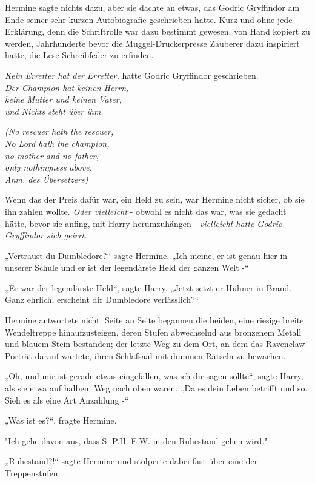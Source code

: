 {Hermine sagte nichts dazu, aber sie dachte an etwas, das Godric Gryffindor am Ende seiner sehr kurzen Autobiografie geschrieben hatte. Kurz und ohne jede Erklärung, denn die Schriftrolle war dazu bestimmt gewesen, von Hand kopiert zu werden, Jahrhunderte bevor die Muggel-Druckerpresse Zauberer dazu inspiriert hatte, die Lese-Schreibfeder zu erfinden.

\emph{Kein Erretter hat der Erretter,} hatte Godric Gryffindor geschrieben.\\ \emph{Der Champion hat keinen Herrn},\\ \emph{keine Mutter und keinen Vater,}\\ \emph{und Nichts steht über ihm.}

\emph{(No rescuer hath the rescuer,}\\ \emph{No Lord hath the champion,}\\ \emph{no mother and no father,\\ only nothingness above.}\\ \emph{Anm. des Übersetzers)}

Wenn das der Preis dafür war, ein Held zu sein, war Hermine nicht sicher, ob sie ihn zahlen wollte. \emph{Oder vielleicht} - obwohl es nicht das war, was sie gedacht hätte, bevor sie anfing, mit Harry herumzuhängen - \emph{vielleicht hatte Godric Gryffindor sich geirrt.}

„Vertraust du Dumbledore?“ sagte Hermine. „Ich meine, er ist genau hier in unserer Schule und er ist der legendärste Held der ganzen Welt -“

„Er war der legendärste Held“, sagte Harry. „Jetzt setzt er Hühner in Brand. Ganz ehrlich, erscheint dir Dumbledore verlässlich?“

Hermine antwortete nicht. Seite an Seite begannen die beiden, eine riesige breite Wendeltreppe hinaufzusteigen, deren Stufen abwechselnd aus bronzenem Metall und blauem Stein bestanden; der letzte Weg zu dem Ort, an dem das Ravenclaw-Porträt darauf wartete, ihren Schlafsaal mit dummen Rätseln zu bewachen.

„Oh, und mir ist gerade etwas eingefallen, was ich dir sagen sollte“, sagte Harry, als sie etwa auf halbem Weg nach oben waren. „Da es dein Leben betrifft und so. Sieh es als eine Art Anzahlung -“

„Was ist es?“, fragte Hermine.

"Ich gehe davon aus, dass S. P.H. E.W. in den Ruhestand gehen wird."

„Ruhestand?!“ sagte Hermine und stolperte dabei fast über eine der Treppenstufen.

}
